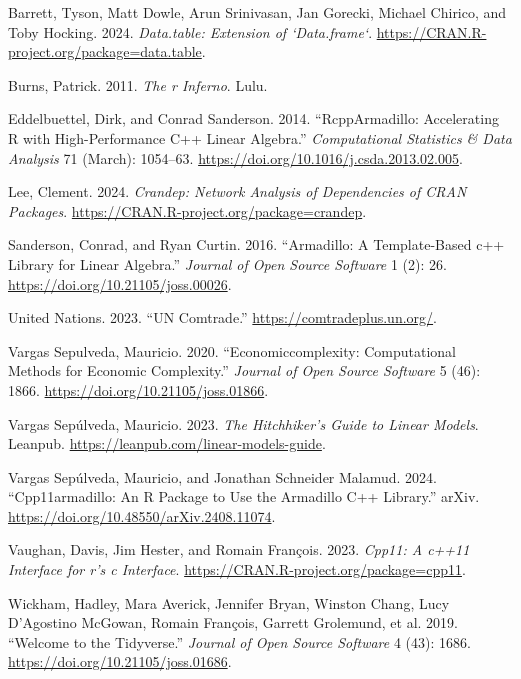 \documentclass[12pt]{article}
\newlength{\cslhangindent}
\newenvironment{CSLReferences}[2] %
 {\begin{list}{}{%
  \setlength{\itemindent}{0pt}
  \setlength{\leftmargin}{0pt}
  \setlength{\parsep}{0pt}
  \ifodd #1
   \setlength{\leftmargin}{\cslhangindent}
   \setlength{\itemindent}{-1\cslhangindent}
  \fi
  \setlength{\itemsep}{#2\baselineskip}}}
 {\end{list}}
\begin{document}
\label{refs}
\begin{CSLReferences}{1}{0}
Barrett, Tyson, Matt Dowle, Arun Srinivasan, Jan Gorecki, Michael
Chirico, and Toby Hocking. 2024. \emph{Data.table: Extension of
`Data.frame`}. \url{https://CRAN.R-project.org/package=data.table}.

Burns, Patrick. 2011. \emph{The r Inferno}. Lulu.

Eddelbuettel, Dirk, and Conrad Sanderson. 2014. {``{RcppArmadillo}:
{Accelerating} {R} with High-Performance {C}++ Linear Algebra.''}
\emph{Computational Statistics \& Data Analysis} 71 (March): 1054--63.
\url{https://doi.org/10.1016/j.csda.2013.02.005}.

Lee, Clement. 2024. \emph{Crandep: Network Analysis of Dependencies of
CRAN Packages}. \url{https://CRAN.R-project.org/package=crandep}.

Sanderson, Conrad, and Ryan Curtin. 2016. {``Armadillo: A Template-Based
c++ Library for Linear Algebra.''} \emph{Journal of Open Source
Software} 1 (2): 26. \url{https://doi.org/10.21105/joss.00026}.

United Nations. 2023. {``{UN} {Comtrade}.''}
\url{https://comtradeplus.un.org/}.

Vargas Sepulveda, Mauricio. 2020. {``Economiccomplexity: {Computational}
{Methods} for {Economic} {Complexity}.''} \emph{Journal of Open Source
Software} 5 (46): 1866. \url{https://doi.org/10.21105/joss.01866}.

Vargas Sepúlveda, Mauricio. 2023. \emph{The {Hitchhiker}'s {Guide} to
{Linear} {Models}}. Leanpub.
\url{https://leanpub.com/linear-models-guide}.

Vargas Sepúlveda, Mauricio, and Jonathan Schneider Malamud. 2024.
{``Cpp11armadillo: {An} {R} {Package} to {Use} the {Armadillo} {C}++
{Library}.''} arXiv. \url{https://doi.org/10.48550/arXiv.2408.11074}.

Vaughan, Davis, Jim Hester, and Romain François. 2023. \emph{Cpp11: A
c++11 Interface for r's c Interface}.
\url{https://CRAN.R-project.org/package=cpp11}.

Wickham, Hadley, Mara Averick, Jennifer Bryan, Winston Chang, Lucy
D'Agostino McGowan, Romain François, Garrett Grolemund, et al. 2019.
{``Welcome to the Tidyverse.''} \emph{Journal of Open Source Software} 4
(43): 1686. \url{https://doi.org/10.21105/joss.01686}.

\end{CSLReferences}

\end{document}
